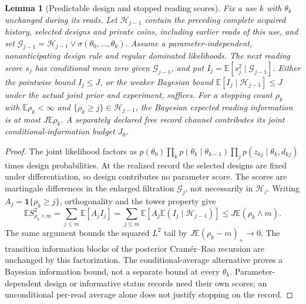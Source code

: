 \documentclass[12pt]{article}
\newtheorem{lemma}[theorem]{Lemma}
\theoremstyle{definition}
\newcommand{\E}{\mathbb E}
\begin{document}
\begin{lemma}[Predictable design and stopped reading scores]
\label{lem:stopped_score}
Fix a use $k$ with $\theta_k$ unchanged during its reads. Let
$\mathcal H_{j-1}$ contain the preceding complete acquired history,
selected designs and private coins, including earlier reads of this use,
and set $\mathcal G_{j-1}=\mathcal H_{j-1}\vee\sigma(\theta_0,\ldots,\theta_k)$.
Assume a parameter-independent, nonanticipating design rule and regular
dominated likelihoods. The next reading score $s_j$ has conditional mean
zero given $\mathcal G_{j-1}$, and put
$I_j=\E[s_j^2\mid\mathcal G_{j-1}]$.
Either the pointwise bound $I_j\le J$, or the weaker Bayesian bound
$\E[I_j\mid\mathcal H_{j-1}]\le J$ under the actual joint prior and experiment,
suffices. For a stopping count $\rho_k$ with $\E\rho_k<\infty$ and
$\{\rho_k\ge j\}\in\mathcal H_{j-1}$, the Bayesian expected reading
information is at most $J\E\rho_k$. A separately declared free record
channel contributes its joint conditional-information budget $J_0$.
\end{lemma}
\begin{proof}
The joint likelihood factors as
$p(\theta_0)\prod_k p(\theta_k\mid\theta_{k-1})
\prod_j p(z_{kj}\mid\theta_k,d_{kj})$ times design probabilities.
At the realized record the selected designs are fixed under
differentiation, so design contributes no parameter score.
The scores are martingale differences in the enlarged filtration
$\mathcal G_j$, not necessarily in $\mathcal H_j$.
Writing $A_j=\mathbf1\{\rho_k\ge j\}$, orthogonality and the tower property give
\[
 \E S_{\rho_k\wedge m}^2
 =\sum_{j\le m}\E[A_j I_j]
 =\sum_{j\le m}\E[A_j\E(I_j\mid\mathcal H_{j-1})]
 \le J\E(\rho_k\wedge m).
\]
The same argument bounds the squared $L^2$ tail by
$J\E(\rho_k-m)_+\to0$. The transition information blocks of the posterior
Cram\'er--Rao recursion are unchanged by this factorization.
The conditional-average alternative proves a Bayesian information bound,
not a separate bound at every $\theta_k$. Parameter-dependent design
or informative status records need their own scores; an unconditional
per-read average alone does not justify stopping on the record.
\end{proof}
\end{document}
